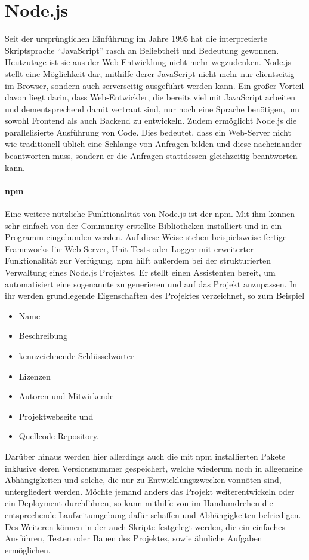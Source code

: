 \section{Node.js}
Seit der ursprünglichen Einführung im Jahre 1995 hat die interpretierte Skriptsprache \enquote{JavaScript} rasch an Beliebtheit und Bedeutung gewonnen.
Heutzutage ist sie aus der Web-Entwicklung nicht mehr wegzudenken.
Node.js stellt eine Möglichkeit dar, mithilfe derer JavaScript nicht mehr nur clientseitig im Browser, sondern auch serverseitig ausgeführt werden kann.
Ein großer Vorteil davon liegt darin, dass Web-Entwickler, die bereits viel mit JavaScript arbeiten und dementsprechend damit vertraut sind, nur noch eine Sprache benötigen, um sowohl Frontend als auch Backend zu entwickeln.
Zudem ermöglicht Node.js die parallelisierte Ausführung von Code.
Dies bedeutet, dass ein Web-Server nicht wie traditionell üblich eine Schlange von Anfragen bilden und diese nacheinander beantworten muss, sondern er die Anfragen stattdessen gleichzeitig beantworten kann.

\paragraph{\ac{npm}}
Eine weitere nützliche Funktionalität von Node.js ist der \acl{npm}.
Mit ihm können sehr einfach von der Community erstellte Bibliotheken installiert und in ein Programm eingebunden werden.
Auf diese Weise stehen beispielsweise fertige Frameworks für Web-Server, Unit-Tests oder Logger  mit erweiterter Funktionalität zur Verfügung.
\ac{npm} hilft außerdem bei der strukturierten Verwaltung eines Node.js Projektes.
Er stellt einen Assistenten bereit, um automatisiert eine sogenannte  zu generieren und auf das Projekt anzupassen.
In ihr werden grundlegende Eigenschaften des Projektes verzeichnet, so zum Beispiel
\begin{itemize}
	\item Name
	\item Beschreibung
	\item kennzeichnende Schlüsselwörter
	\item Lizenzen
	\item Autoren und Mitwirkende
	\item Projektwebseite und
	\item Quellcode-Repository.
\end{itemize}
Darüber hinaus werden hier allerdings auch die mit \ac{npm} installierten Pakete inklusive deren Versionsnummer gespeichert, welche wiederum noch in allgemeine Abhängigkeiten und solche, die nur zu Entwicklungszwecken vonnöten sind, untergliedert werden.
Möchte jemand anders das Projekt weiterentwickeln oder ein Deployment durchführen, so kann mithilfe von  im Handumdrehen die entsprechende Laufzeitumgebung dafür schaffen und Abhängigkeiten befriedigen.
Des Weiteren können in der  auch Skripte festgelegt werden, die ein einfaches Ausführen, Testen oder Bauen des Projektes, sowie ähnliche Aufgaben ermöglichen.~\cite{package.json}

